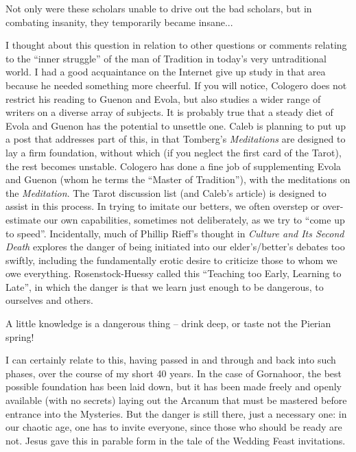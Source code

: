 \begin{quotex}
Not only were these scholars unable to drive out the bad scholars, but in combating insanity, they temporarily became insane...
\end{quotex}

I thought about this question in relation to other questions or comments relating to the ``inner struggle'' of the man of Tradition in today's very untraditional world. I had a good acquaintance on the Internet give up study in that area because he needed something more cheerful. If you will notice, Cologero does not restrict his reading to Guenon and Evola, but also studies a wider range of writers on a diverse array of subjects. It is probably true that a steady diet of Evola and Guenon has the potential to unsettle one. Caleb is planning to put up a post that addresses part of this, in that Tomberg's \emph{Meditations} are designed to lay a firm foundation, without which (if you neglect the first card of the Tarot), the rest becomes unstable. Cologero has done a fine job of supplementing Evola and Guenon (whom he terms the ``Master of Tradition''), with the meditations on the \emph{Meditation}. The Tarot discussion list (and Caleb's article) is designed to assist in this process. In trying to imitate our betters, we often overstep or over-estimate our own capabilities, sometimes not deliberately, as we try to ``come up to speed''. Incidentally, much of Phillip Rieff's thought in \emph{Culture and Its Second Death} explores the danger of being initiated into our elder's/better's debates too swiftly, including the fundamentally erotic desire to criticize those to whom we owe everything. Rosenstock-Huessy called this ``Teaching too Early, Learning to Late'', in which the danger is that we learn just enough to be dangerous, to ourselves and others.

\begin{quotex}
A little knowledge is a dangerous thing -- drink deep, or taste not the Pierian spring!
\end{quotex}


I can certainly relate to this, having passed in and through and back into such phases, over the course of my short 40 years. In the case of Gornahoor, the best possible foundation has been laid down, but it has been made freely and openly available (with no secrets) laying out the Arcanum that must be mastered before entrance into the Mysteries. But the danger is still there, just a necessary one: in our chaotic age, one has to invite everyone, since those who should be ready are not. Jesus gave this in parable form in the tale of the Wedding Feast invitations.

